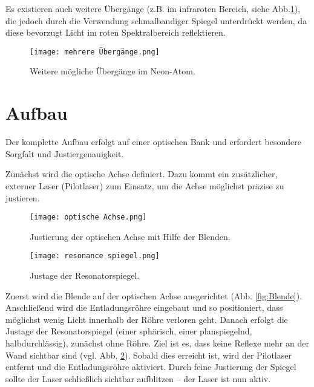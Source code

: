 Es existieren auch weitere Übergänge (z.B. im infraroten Bereich, siehe Abb.\ref{fig:Übergang}), die jedoch durch die Verwendung schmalbandiger Spiegel unterdrückt werden, da diese bevorzugt Licht im roten Spektralbereich reflektieren.

\FloatBarrier
\begin{figure}[htbp]
\centering
\texttt{[image: mehrere Übergänge.png]}
\caption{Weitere mögliche Übergänge im Neon-Atom. \cite{praktikum}}
\label{fig:Übergang}
\end{figure}
\FloatBarrier




\section{Aufbau}


Der komplette Aufbau erfolgt auf einer optischen Bank und erfordert besondere Sorgfalt und Justiergenauigkeit.

Zunächst wird die optische Achse definiert. 
Dazu kommt ein zusätzlicher, externer Laser (Pilotlaser) zum Einsatz, um die Achse möglichst präzise zu justieren.

\begin{figure}[htbp]
    \centering
    \begin{minipage}[t]{0.48\textwidth}
        \centering
        \texttt{[image: optische Achse.png]}
       \caption{Justierung der optischen Achse mit Hilfe der Blenden. \cite{praktikum}}
        \label{fig:Blende}
    \end{minipage}
    \hfill
    \begin{minipage}[t]{0.48\textwidth}
        \centering
        \texttt{[image: resonance spiegel.png]}
        \caption{Justage der Resonatorspiegel. \cite{praktikum}}
        \label{fig:Spiegel}
   \end{minipage}
\end{figure}

Zuerst wird die Blende auf der optischen Achse ausgerichtet (Abb. \ref{fig:Blende}). 
Anschließend wird die Entladungsröhre eingebaut und so positioniert, dass möglichst wenig Licht innerhalb der Röhre verloren geht.
Danach erfolgt die Justage der Resonatorspiegel (einer sphärisch, einer planspiegelnd, halbdurchlässig), zunächst ohne Röhre. 
Ziel ist es, dass keine Reflexe mehr an der Wand sichtbar sind (vgl. Abb. \ref{fig:Spiegel}). 
Sobald dies erreicht ist, wird der Pilotlaser entfernt und die Entladungsröhre aktiviert. 
Durch feine Justierung der Spiegel sollte der Laser schließlich sichtbar aufblitzen – der Laser ist nun aktiv.



